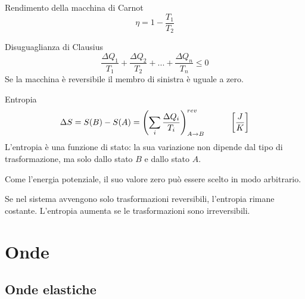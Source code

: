 \documentclass[a4paper,11pt,italian]{article}
\begin{document}
\begin{description}
\begin{soloscientifico}
  \item[Rendimento della macchina di Carnot] 
  \[ \eta = 1 - \frac{T_1}{T_2} \]

  \item[Disuguaglianza di Clausius] 
  \[ \frac{\Delta Q_1}{T_1} + \frac{\Delta Q_2}{T_2} + ... + \frac{\Delta Q_n}{T_n} \leq 0  \]
  Se la macchina è reversibile il membro di sinistra è uguale a zero.

  \item[Entropia]
  \[ \Delta S = S(B) - S(A) = \left( \sum_i \frac{\Delta Q_i}{T_i} \right)^{rev}_{A \rightarrow B} \hspace*{3em} \left[ \frac{J}{K} \right]\]
  L'entropia è una funzione di stato: la sua variazione non dipende dal tipo di trasformazione, ma solo dallo stato $ B $ e dallo stato $ A $.
  
  Come l'energia potenziale, il suo valore zero può essere scelto in modo arbitrario.
  
  Se nel sistema avvengono solo trasformazioni reversibili, l'entropia rimane costante. L'entropia aumenta se le trasformazioni sono irreversibili.

\end{soloscientifico}   %
\end{description}



\newpage
\section{Onde}

\subsection{Onde elastiche}
\end{document}
